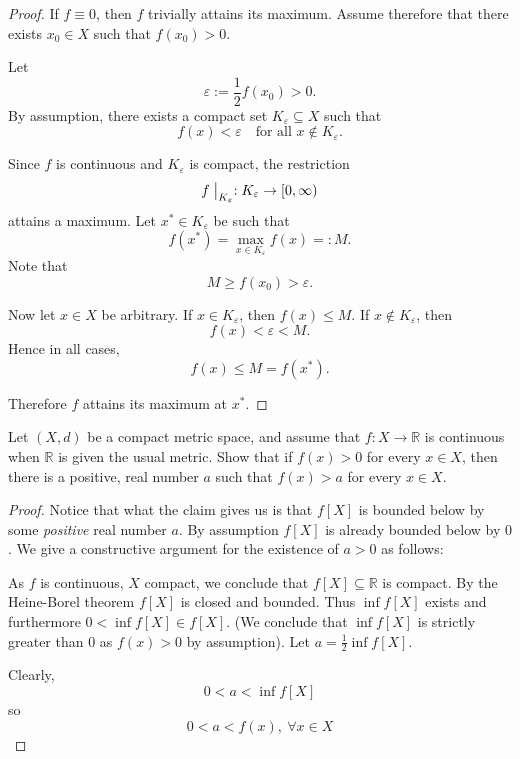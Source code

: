 \begin{proof}
    If $f \equiv 0$, then $f$ trivially attains its maximum.
    Assume therefore that there exists $x_0 \in X$ such that
    $f(x_0) > 0$.

    Let
    \[
        \varepsilon := \frac{1}{2} f(x_0) > 0.
    \]
    By assumption, there exists a compact set
    $K_\varepsilon \subseteq X$ such that
    \[
        f(x) < \varepsilon \quad \text{for all } x \notin K_\varepsilon.
    \]

    Since $f$ is continuous and $K_\varepsilon$ is compact, the
    restriction
    \[
        f\bigm|_{K_\varepsilon} : K_\varepsilon \to [0,\infty)
    \]
    attains a maximum. Let $x^* \in K_\varepsilon$ be such that
    \[
        f(x^*) = \max_{x \in K_\varepsilon} f(x) =: M.
    \]
    Note that
    \[
        M \ge f(x_0) > \varepsilon.
    \]

    Now let $x \in X$ be arbitrary. If $x \in K_\varepsilon$, then
    $f(x) \le M$. If $x \notin K_\varepsilon$, then
    \[
        f(x) < \varepsilon < M.
    \]
    Hence in all cases,
    \[
        f(x) \le M = f(x^*).
    \]

    Therefore $f$ attains its maximum at $x^*$.
\end{proof}

\begin{prob}
    Let $(X,d)$ be a compact metric space, and assume that 
    $f : X \to \mathbb R$ is continuous when $\mathbb R$ is 
    given the usual metric. Show that if $f(x) > 0$ for 
    every $x \in X$, then there is a positive, real number
    $a$ such that $f(x) > a$ for every $x \in X$.
\end{prob}
\begin{proof}
    Notice that what the claim gives us is that 
    $f[X]$ is bounded below by some \emph{positive} real 
    number $a$. By assumption $f[X]$ is already bounded 
    below by $0$. We give a constructive argument 
    for the existence of $a > 0$ as follows: 

    As $f$ is continuous, $X$ compact, we conclude that 
    $f[X] \subseteq \mathbb R$ is compact. By the Heine-Borel 
    theorem $f[X]$ is closed and bounded. 
    Thus $\inf f[X]$ exists and furthermore $0 < \inf f[X] \in f[X]$.
    (We conclude that $\inf f[X]$ is strictly greater than $0$ 
    as $f(x) > 0$ by assumption).
    Let $a = \frac{1}{2} \inf f[X]$. 

    Clearly, 
    \[
        0 < a < \inf f[X]
    \]
    so 
    \[
        0 < a < f(x), \: \forall x \in X
    \]
    
\end{proof}

